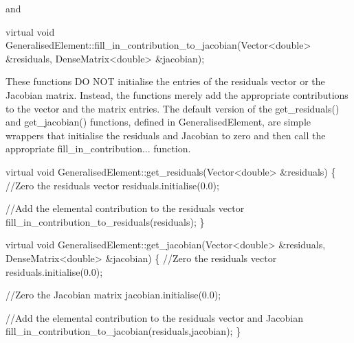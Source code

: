 and


\begin{DoxyCode}
\textcolor{keyword}{virtual} \textcolor{keywordtype}{void} GeneralisedElement::fill\_in\_contribution\_to\_jacobian(Vector<double> &residuals,
                                                                  DenseMatrix<double> &jacobian); 
\end{DoxyCode}


These functions DO N\+OT initialise the entries of the residuals vector or the Jacobian matrix. Instead, the functions merely add the appropriate contributions to the vector and the matrix entries. The default version of the {\ttfamily get\+\_\+residuals()} and {\ttfamily get\+\_\+jacobian()} functions, defined in {\ttfamily Generalised\+Element}, are simple wrappers that initialise the residuals and Jacobian to zero and then call the appropriate {\ttfamily fill\+\_\+in\+\_\+contribution}... function. 
\begin{DoxyCode}
\textcolor{keyword}{virtual} \textcolor{keywordtype}{void} GeneralisedElement::get\_residuals(Vector<double> &residuals) 
\{
 \textcolor{comment}{//Zero the residuals vector}
 residuals.initialise(0.0);

 \textcolor{comment}{//Add the elemental contribution to the residuals vector}
 fill\_in\_contribution\_to\_residuals(residuals);
\}

\textcolor{keyword}{virtual} \textcolor{keywordtype}{void} GeneralisedElement::get\_jacobian(Vector<double> &residuals, 
                                              DenseMatrix<double> &jacobian) 
\{
 \textcolor{comment}{//Zero the residuals vector}
 residuals.initialise(0.0);

 \textcolor{comment}{//Zero the Jacobian matrix}
 jacobian.initialise(0.0);

 \textcolor{comment}{//Add the elemental contribution to the residuals vector and Jacobian}
 fill\_in\_contribution\_to\_jacobian(residuals,jacobian);
\} 
\end{DoxyCode}


